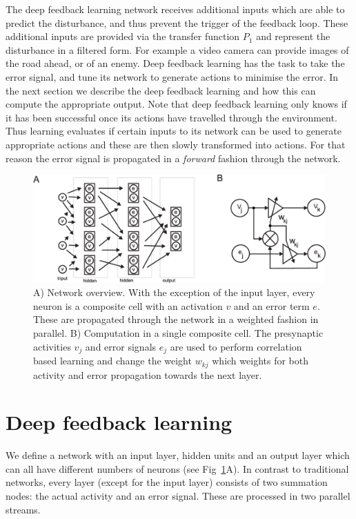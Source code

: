 \documentclass{aamas2017}
\begin{document}
The deep feedback learning network receives additional inputs which are able
to predict the disturbance, and thus prevent the trigger of the feedback
loop. These additional inputs are provided via the transfer function $P_1$
and represent the disturbance in a filtered form. For example a video camera
can provide images of the road ahead, or of an enemy. Deep feedback
learning has the task to take the error signal, and tune its network
to generate actions to minimise the error. In the next section
we describe the deep feedback learning and how this can
compute the appropriate output. Note that deep feedback learning only knows if it has been
successful once its actions have travelled through the environment. Thus learning
evaluates if certain inputs to its network can be used to generate
appropriate actions and these are then slowly transformed into actions.
For that reason the error signal is propagated in a \textsl{forward} fashion
through the network.

\begin{figure}[!ht]
  \centering
  \includegraphics[width=\columnwidth]{netw_together}
  \caption{A) Network overview. With the exception of the input layer, every
    neuron is a composite cell with an activation $v$ and an error
    term $e$. These are propagated through the network in a weighted
    fashion in parallel.  B) Computation in a single composite cell.
    The presynaptic activities $v_j$ and error signals $e_j$ are used
    to perform correlation based learning and change the weight
    $w_{kj}$ which weights for both activity and error propagation towards the next
    layer.\label{netw_together}}
\end{figure}


\section{Deep feedback learning}
We define a network with an input layer, hidden units and an output
layer which can all have different numbers of neurons (see
Fig~\ref{netw_together}A). In contrast to traditional
networks, every layer (except for the input layer) consists of two
summation nodes: the actual activity and an error signal. These
are processed in two parallel streams.
\end{document}

